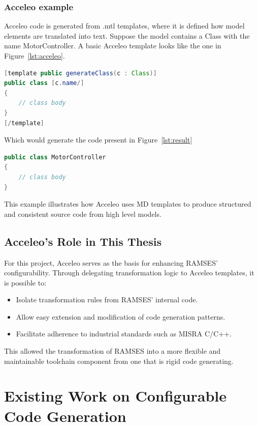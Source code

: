 \subsubsection{Acceleo example}
\label{sec:example}

Acceleo code is generated from .mtl templates, where it is defined how model elements are translated into text.
Suppose the model contains a Class with the name MotorController. A basic Acceleo template looks like the one in Figure~\ref{lst:acceleo}.

\begin{lstlisting}[language=Java, caption={Acceleo template example}, label={lst:acceleo}]
[template public generateClass(c : Class)]
public class [c.name/]
{
	// class body
}
[/template]
\end{lstlisting}

Which would generate the code present in Figure~\ref{lst:result}

\begin{lstlisting}[language=Java, caption={Example of generated code}, label={lst:result}]
public class MotorController
{
	// class body
}
\end{lstlisting}

This example illustrates how Acceleo uses \gls{MD} templates to produce structured and consistent source code from high level models.

\subsection{Acceleo's Role in This Thesis}
\label{sec:role}

For this project, Acceleo serves as the basis for enhancing \gls{RAMSES}' configurability. Through delegating transformation logic to Acceleo templates, it is possible to: 
\begin{itemize} 
	\item Isolate transformation rules from \gls{RAMSES}' internal code.
	\item Allow easy extension and modification of code generation patterns.
	\item Facilitate adherence to industrial standards such as \gls{MISRA} C/C++.
\end{itemize}

This allowed the transformation of \gls{RAMSES} into a more flexible and maintainable toolchain component from one that is rigid code generating.


\section{Existing Work on Configurable Code Generation} \label{sec:configurable_generation}

